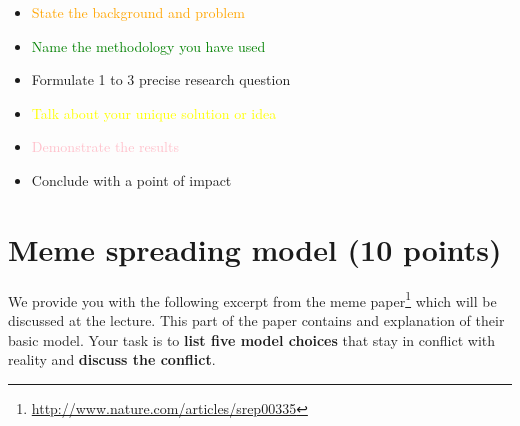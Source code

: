 \documentclass{WeSTassignment}
\begin{document}
\begin{itemize}
\item \textcolor{orange}{State the background and problem}
\item \textcolor{green}{Name the methodology you have used}
\item Formulate 1 to 3 precise research question 
\item \textcolor{yellow}{Talk about your unique solution or idea}
\item \textcolor{pink}{Demonstrate the results}
\item Conclude with a point of impact
\end{itemize}






\section{Meme spreading model (10 points)}
We provide you with the following excerpt from the meme paper\footnote{ \url {http://www.nature.com/articles/srep00335} } which will be discussed at the lecture. This part of the paper contains and explanation of their basic model. Your task is to \textbf{list five model choices} that stay in conflict with reality and \textbf{discuss the conflict}. 
\end{document}
